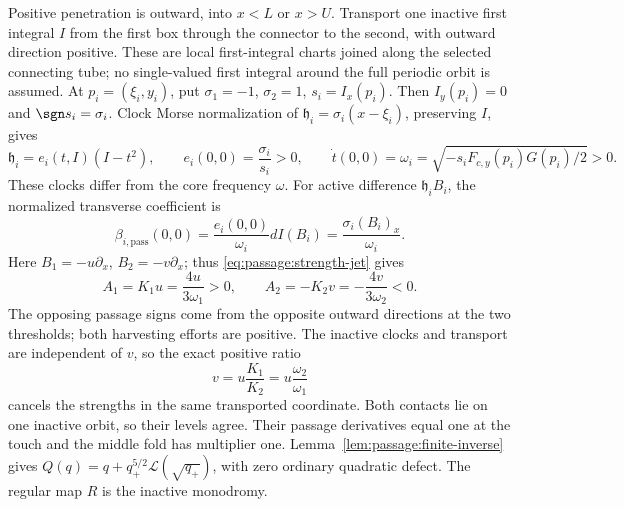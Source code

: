Positive penetration is outward, into \(x<L\) or \(x>U\).
Transport one inactive first integral \(I\) from the first box through
the connector to the second, with outward direction positive. These are
local first-integral charts joined along the selected connecting tube;
no single-valued first integral around the full periodic orbit is assumed. At
\(p_i=(\xi_i,y_i)\), put \(\sigma_1=-1\), \(\sigma_2=1\),
\(s_i=I_x(p_i)\). Then \(I_y(p_i)=0\) and
\(\sgn s_i=\sigma_i\). Clock Morse normalization of
\(\mathfrak h_i=\sigma_i(x-\xi_i)\), preserving \(I\), gives
\begin{equation}\label{eq:harvesting:clock}
 \mathfrak h_i=e_i(t,I)(I-t^2),\qquad
 e_i(0,0)=\frac{\sigma_i}{s_i}>0,\qquad
 \dot t(0,0)=\omega_i
 =\sqrt{-s_iF_{c,y}(p_i)G(p_i)/2}>0.
\end{equation}
These clocks differ from the core frequency \(\omega\). For active
difference \(\mathfrak h_iB_i\), the normalized transverse coefficient is
\[
 \beta_{i,\mathrm{pass}}(0,0)
 =\frac{e_i(0,0)}{\omega_i}dI(B_i)
 =\frac{\sigma_i(B_i)_x}{\omega_i}.
\]
Here \(B_1=-u\partial_x\), \(B_2=-v\partial_x\); thus
\eqref{eq:passage:strength-jet} gives
\begin{equation}\label{eq:harvesting:strengths}
 A_1=K_1u=\frac{4u}{3\omega_1}>0,\qquad
 A_2=-K_2v=-\frac{4v}{3\omega_2}<0.
\end{equation}
The opposing passage signs come from the opposite outward directions at
the two thresholds; both harvesting efforts are positive.
The inactive clocks and transport are independent of \(v\), so
the exact positive ratio
\begin{equation}\label{eq:harvesting:effort-relation}
 v=u\frac{K_1}{K_2}=u\frac{\omega_2}{\omega_1}
\end{equation}
cancels the strengths in the same transported coordinate.
Both contacts lie on one inactive orbit, so their levels agree.
Their passage derivatives equal one at the touch and the middle fold
has multiplier one. Lemma~\ref{lem:passage:finite-inverse} gives
\(Q(q)=q+q_+^{5/2}\mathcal L(\sqrt{q_+})\), with zero ordinary
quadratic defect. The regular map \(R\) is the inactive monodromy.

